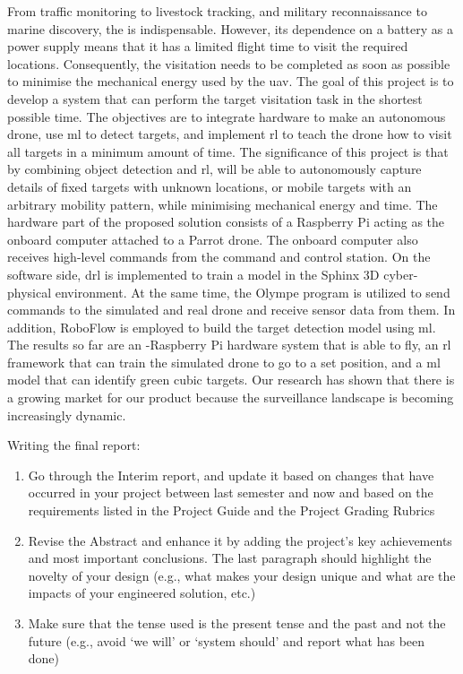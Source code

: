 \documentclass[../main.tex]{subfiles}
\begin{document}
From traffic monitoring to livestock tracking, and 
military reconnaissance to marine discovery, the \uav
is indispensable.
However, its dependence on a battery as a power supply means
that it has a limited flight time to visit the required
locations. 
Consequently, the visitation needs to be
completed as soon as possible to minimise 
the mechanical energy used by the \gls{uav}.
The goal of this project is to develop a system 
that can perform the target visitation task in the shortest
possible time. The objectives are to integrate hardware to make
an autonomous drone, use \gls{ml} 
to detect targets,
and implement \gls{rl} to 
teach the drone how to visit all targets in a minimum amount of time.
The significance of this project is that 
by combining object detection and \gls{rl}, \uavs will be
able to autonomously capture details of 
fixed targets with unknown locations, 
or mobile targets with an arbitrary mobility pattern,
while minimising mechanical energy and time.
The hardware part of the proposed solution 
consists of a Raspberry Pi acting as the onboard computer
attached to a Parrot \anafi drone. The onboard computer
also receives high-level commands from the command and control
station. On the software side, \gls{drl} is 
implemented to train a model in the Sphinx 3D
cyber-physical environment. At the same time,
the Olympe program is utilized
to send commands to the simulated and real \anafi drone
and receive sensor data from them. 
In addition, RoboFlow is employed
to build the target detection model using \gls{ml}.
The results so far are an \anafi-Raspberry Pi hardware system
that is able to fly, an \gls{rl} framework that can train the
simulated drone to go to a set position, and a \gls{ml}
model that can identify green cubic targets.
Our research has shown that there is a growing market for
our product because the surveillance landscape
is becoming increasingly dynamic.

\vfill
\begin{newrequirements}
    Writing the final report:
    \begin{enumerate}
        \item Go through the Interim report, 
            and update it based on changes that have occurred 
            in your project between last semester and now
            and based on the requirements listed in the 
            Project Guide and the Project Grading Rubrics
        \item Revise the Abstract and enhance it by adding 
            the project’s key achievements and most important 
            conclusions. 
            The last paragraph should highlight the novelty 
            of your design (e.g., what makes your design 
            unique and what are the impacts of your 
            engineered solution, etc.)
        \item Make sure that the tense used is the present 
            tense and the past and not the future 
            (e.g., avoid ‘we will’ or ‘system should’ 
            and report what has been done) 
    \end{enumerate}
\end{newrequirements}
\vspace{0.5cm}
\end{document}
